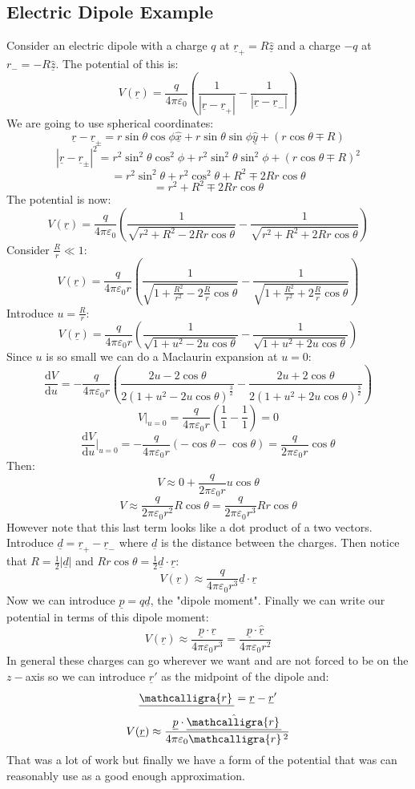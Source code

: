 \documentclass[12pt]{article}
\newcommand{\df}[2]{\frac{\text{d}#1}{\text{d}#2}}
\newcommand{\scriptr}{\ensuremath{\mathcalligra{r}}\,}
\begin{document}
\subsection{Electric Dipole Example}
Consider an electric dipole with a charge \(q\) at \(\underline{r}_+=R\underline{\hat{z}}\) and a charge \(-q\) at \(r_-=-R\underline{\hat{z}}\). The potential of this is:
\[V(\underline{r})=\frac{q}{4\pi\varepsilon_0}\left(\frac{1}{|\underline{r}-\underline{r}_+|}-\frac{1}{|\underline{r}-\underline{r}_-|}\right)\]
We are going to use spherical coordinates:
\[\underline{r}-\underline{r}_{\pm}=r\sin\theta\cos\phi \underline{\hat{x}}+r\sin\theta\sin\phi\underline{\hat{y}}+(r\cos\theta\mp R)\]
\[|\underline{r}-\underline{r}_{\pm}|^2=r^2\sin^2\theta\cos^2\phi+r^2\sin^2\theta\sin^2\phi+(r\cos\theta\mp R)^2\]
\[=r^2\sin^2\theta+r^2\cos^2\theta+R^2\mp 2Rr\cos\theta\]
\[=r^2+R^2\mp 2Rr\cos\theta\]
The potential is now:
\[V(\underline{r})=\frac{q}{4\pi\varepsilon_0}\left(\frac{1}{\sqrt{r^2+R^2-2Rr\cos\theta}}-\frac{1}{\sqrt{r^2+R^2+2Rr\cos\theta}}\right)\]
Consider \(\frac{R}{r}\ll 1\):
\[V(\underline{r})=\frac{q}{4\pi\varepsilon_0r}\left(\frac{1}{\sqrt{1+\frac{R^2}{r^2}-2\frac{R}{r}\cos\theta}}-\frac{1}{\sqrt{1+\frac{R^2}{r^2}+2\frac{R}{r}\cos\theta}}\right)\]
Introduce \(u=\frac{R}{r}\):
\[V(\underline{r})=\frac{q}{4\pi\varepsilon_0r}\left(\frac{1}{\sqrt{1+u^2-2u\cos\theta}}-\frac{1}{\sqrt{1+u^2+2u\cos\theta}}\right)\]
Since \(u\) is so small we can do a Maclaurin expansion at \(u=0\):
\[\df{V}{u}=-\frac{q}{4\pi\varepsilon_0r}\left(\frac{2u-2\cos\theta}{2(1+u^2-2u\cos\theta)^{\frac{3}{2}}}-\frac{2u+2\cos\theta}{2(1+u^2+2u\cos\theta)^{\frac{3}{2}}}\right)\]
\[V|_{u=0}=\frac{q}{4\pi\varepsilon_0r}\left(\frac{1}{1}-\frac{1}{1}\right)=0\]
\[\df{V}{u}|_{u=0}=-\frac{q}{4\pi\varepsilon_0r}\left(-\cos\theta-\cos\theta\right)=\frac{q}{2\pi\varepsilon_0r}\cos\theta\]
Then:
\[V\approx0+\frac{q}{2\pi\varepsilon_0r}u\cos\theta\]
\[V\approx\frac{q}{2\pi\varepsilon_0r^2}R\cos\theta=\frac{q}{2\pi\varepsilon_0r^3}Rr\cos\theta\]
However note that this last term looks like a dot product of a two vectors. Introduce \(\underline{d}=\underline{r}_+-\underline{r}_-\) where \(\underline{d}\) is the distance between the charges. Then notice that \(R=\frac{1}{2}|\underline{d}|\) and \(Rr\cos\theta=\frac{1}{2}\underline{d}\cdot\underline{r}\):
\[V(\underline{r})\approx\frac{q}{4\pi\varepsilon_0r^3}\underline{d}\cdot\underline{r}\]
Now we can introduce \(\underline{p}=q\underline{d}\), the "dipole moment". Finally we can write our potential in terms of this dipole moment:
\[V(\underline{r})\approx\frac{\underline{p}\cdot\underline{r}}{4\pi\varepsilon_0r^3}=\frac{\underline{p}\cdot\underline{\hat{r}}}{4\pi\varepsilon_0r^2}\]
In general these charges can go wherever we want and are not forced to be on the \(z-\)axis so we can introduce \(\underline{r}'\) as the midpoint of the dipole and:
\[\underline{\scriptr}=\underline{r}-\underline{r}'\]
\[V(\underline{r})\approx\frac{\underline{p}\cdot\underline{\hat{\scriptr}}}{4\pi\varepsilon_0\scriptr^2}\]
That was a lot of work but finally we have a form of the potential that was can reasonably use as a good enough approximation.
\end{document}

